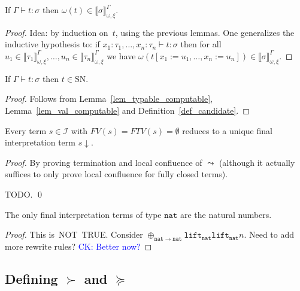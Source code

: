 \documentclass[runningheads,a4paper]{llncs}
\newcommand{\Iterms}{\mathcal{I}}
\newcommand{\subst}[2]{#1:=#2}
\newcommand{\FTV}{\mathit{FTV}}
\newcommand{\FV}{\mathit{FV}}
\newcommand{\nat}{\mathtt{nat}}
\newcommand{\lift}{\mathtt{lift}}
\newcommand{\SN}{\mathrm{SN}}
\newcommand{\val}[3]{\ensuremath{\llbracket#1\rrbracket_{#2}^{#3}}}
\newcommand{\proves}{\vdash}
\newcommand{\CK}[1]{\textcolor{blue}{CK: #1}}
\begin{document}
\begin{lemma}\label{lem_typable_computable}
  If $\Gamma \proves t : \sigma$ then
  $\omega(t) \in \val{\sigma}{\omega,\xi}{\Gamma}$.
\end{lemma}

\begin{proof}
  Idea: by induction on~$t$, using the previous lemmas. One
  generalizes the inductive hypothesis to: if
  $x_1 : \tau_1,\ldots,x_n:\tau_n \proves t : \sigma$ then for all
  $u_1\in\val{\tau_1}{\omega,\xi}{\Gamma},\ldots,u_n\in\val{\tau_n}{\omega,\xi}{\Gamma}$
  we have
  $\omega(t[\subst{x_1}{u_1},\ldots,\subst{x_n}{u_n}]) \in
  \val{\sigma}{\omega,\xi}{\Gamma}$.
\end{proof}

\begin{corollary}
  If $\Gamma \proves t : \sigma$ then $t \in \SN$.
\end{corollary}

\begin{proof}
  Follows from Lemma~\ref{lem_typable_computable},
  Lemma~\ref{lem_val_computable} and Definition~\ref{def_candidate}.
\end{proof}

\begin{lemma}
Every term $s \in \Iterms$ with $\FV(s) = \FTV(s) = \emptyset$ reduces
to a unique final interpretation term $s\downarrow$.
\end{lemma}

\begin{proof}
By proving termination and local confluence of $\leadsto$ (although it
actually suffices to only prove local confluence for fully closed terms).

TODO.
\qed
\end{proof}

\begin{lemma}
The only final interpretation terms of type $\nat$ are the natural
numbers.
\end{lemma}

\begin{proof}
  This is~NOT~TRUE. Consider
  $\oplus_{\nat\to\nat} \lift_\nat \lift_\nat n$. Need to add more
  rewrite rules?
  \CK{Better now?}
\end{proof}

\subsection{Defining $\succ$ and $\succeq$}
\end{document}
